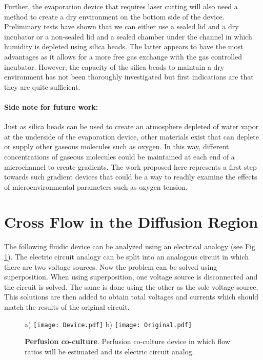 Further, the evaporation device that requires laser cutting will also need a method to create a dry environment on the bottom side of the device. Preliminary tests have shown that we can either use a sealed lid and a dry incubator or a non-sealed lid and a sealed chamber under the channel in which humidity is depleted using silica beads. The latter appears to have the most advantages as it allows for a more free gas exchange with the gas controlled incubator. However, the capacity of the silica beads to maintain a dry environment has not been thoroughly investigated but first indications are that they are quite sufficient.

\paragraph{Side note for future work:}Just as silica beads can be used to create an atmosphere depleted of water vapor at the underside of the evaporation device, other materials exist that can deplete or supply other gaseous molecules such as oxygen. In this way, different concentrations of gaseous molecules could be maintained at each end of a microchannel to create gradients. The work proposed here represents a first step towards such gradient devices that could be a way to readily examine the effects of microenvironmental parameters such as oxygen tension.

\section{Cross Flow in the Diffusion Region}
The following fluidic device can be analyzed using an electrical analogy (see Fig \ref{App:PerfusionCulture:fig:device}). The electric circuit analogy can be split into an analogous circuit in which there are two voltage sources. Now the problem can be solved using superposition. When using superposition, one voltage source is disconnected and the circuit is solved. The same is done using the other as the sole voltage source. This solutions are then added to obtain total voltages and currents which should match the results of the original circuit. 

\begin{figure}[!ht]
\centering
a) \texttt{[image: Device.pdf]}     b) \texttt{[image: Original.pdf]}
\caption{\textbf{Perfusion co-culture}. Perfusion co-culture device in which flow ratios will be estimated and its electric circuit analog.}
\label{App:PerfusionCulture:fig:device}
\end{figure}

